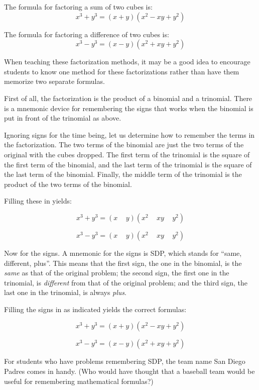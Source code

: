 \documentclass[12pt]{article}
\begin{document}

The formula for factoring a sum of two cubes is:
\[
x^3+y^3=(x+y)(x^2-xy+y^2)
\]

The formula for factoring a difference of two cubes is:
\[
x^3-y^3=(x-y)(x^2+xy+y^2)
\]

When teaching these factorization methods, it may be a good idea to encourage students to know one method for these factorizations rather than have them memorize two separate formulas.

First of all, the factorization is the product of a binomial and a trinomial.  There is a mnemonic device for remembering the signs that works when the binomial is put in front of the trinomial as above.

Ignoring signs for the time being, let us determine how to remember the terms in the factorization.  The two terms of the binomial are just the two terms of the original with the cubes dropped.  The first term of the trinomial is the square of the first term of the binomial, and the last term of the trinomial is the square of the last term of the binomial.  Finally, the middle term of the trinomial is the product of the two terms of the binomial.

Filling these in yields:

\[
x^3+y^3=(x \,\,\,\,\,\,\, y)(x^2 \,\,\,\,\,\,\, xy \,\,\,\,\,\,\, y^2)
\]

\[
x^3-y^3=(x \,\,\,\,\,\,\, y)(x^2 \,\,\,\,\,\,\, xy \,\,\,\,\,\,\, y^2)
\]

Now for the signs.  A mnemonic for the signs is SDP, which stands for ``same, different, plus''.  This means that the first sign, the one in the binomial, is the \emph{same} as that of the original problem; the second sign, the first one in the trinomial, is \emph{different} from that of the original problem; and the third sign, the last one in the trinomial, is always \emph{plus}.

Filling the signs in as indicated yields the correct formulas:

\[
x^3+y^3=(x+y)(x^2-xy+y^2)
\]

\[
x^3-y^3=(x-y)(x^2+xy+y^2)
\]

For students who have problems remembering SDP, the team name San Diego Padres comes in handy.  (Who would have thought that a baseball team would be useful for remembering mathematical formulas?)
\end{document}
